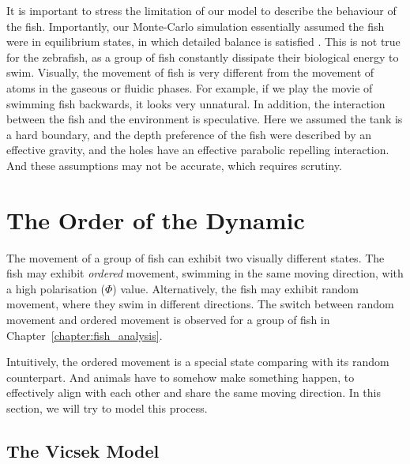 \documentclass[11pt,twoside]{report}
\begin{document}
It is important to stress the limitation of our model to describe the behaviour of the fish. Importantly, our Monte-Carlo simulation essentially assumed the fish were in equilibrium states, in which detailed balance is satisfied \cite{newman1999}. This is not true for the zebrafish, as a group of fish constantly dissipate their biological energy to swim. Visually, the movement of fish is very different from the movement of atoms in the gaseous or fluidic phases. For example, if we play the movie of swimming fish backwards, it looks very unnatural. In addition, the interaction between the fish and the environment is speculative. Here we assumed the tank is a hard boundary, and the depth preference of the fish were described by an effective gravity, and the holes have an effective parabolic repelling interaction. And these assumptions may not be accurate, which requires scrutiny.


\section{The Order of the Dynamic}
\label{section:simulate-dynamics}

The movement of a group of fish can exhibit two visually different states. The fish may exhibit \emph{ordered} movement, swimming in the same moving direction, with a high polarisation ($\Phi$) value. Alternatively, the fish may exhibit random movement, where they swim in different directions. The switch between random movement and ordered movement is observed for a group of fish in Chapter~\ref{chapter:fish_analysis}.

Intuitively, the ordered movement is a special state comparing with its random counterpart. And animals have to somehow make something happen, to effectively align with each other and share the same moving direction. In this section, we will try to model this process.


\subsection{The Vicsek Model}
\label{section:vicsek-model}
\end{document}
